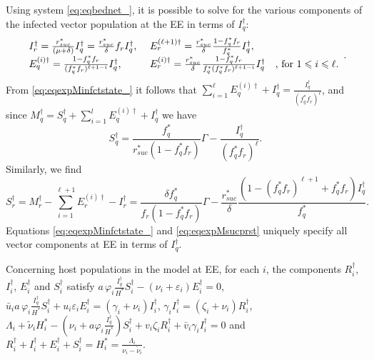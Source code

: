 \documentclass[a4paper]{article}
\newcommand{\dsum}{\displaystyle\sum}
\newcommand{\varpiVar}{r_{suc}}
\begin{document}
Using system \eqref{eq:eqbednet_}, it is possible to solve for the various components of the infected vector population at the EE  in terms of $I_q^\dagger $:
\begin{equation}\label{eq:eqexpMinfctstate_}\begin{array}{ll}
I_r^\dagger =\frac{\varpiVar ^*}{(\mu+\delta)}I_q^\dagger =\frac{\varpiVar ^* }{\delta }f_rI_q^\dagger \hbox{, } & E_r^{(\ell+1)\dagger }=\frac{\varpiVar ^*}{\delta }\frac{1-f^*_qf_r}{f^*_q} I_q^\dagger ,\\ E_q^{(i)\dagger }=\frac{1-f^*_qf_r }{(f^*_qf_r)^{\ell+1-i}}I_q^\dagger \hbox{, } & E_r^{(i)\dagger }=\frac{\varpiVar ^*}{\delta }\frac{1-f^*_qf_r}{ f^*_q(f^*_qf_r)^{\ell+1-i}} I_q^\dagger \quad\hbox{, for } 1\leqslant i\leqslant \ell.\end{array}.
\end{equation}
From \eqref{eq:eqexpMinfctstate_} it follows that $\dsum_{i=1}^\ell E_q^{(i)\dagger }+I_q^\dagger =\frac{I_q^\dagger }{(f^*_qf_r)^\ell}$, and  since $M_q^\dagger=S^\dagger _q+\dsum_{i=1}^lE_q^{(i)\dagger }+I_q^\dagger $ we have
\begin{equation*}
S_q^\dagger =\frac{f^*_q}{\varpiVar ^*(1-f^*_qf_r)}\Gamma - \frac{I_q^\dagger }{(f^*_qf_r)^\ell}.\label{eq:eqexpMsucpqst}
\end{equation*}
Similarly, we find
\begin{equation}
S_r^\dagger =M_r^\dagger -\dsum_{i=1}^{\ell+1}E_r^{(i)\dagger }-I_r^\dagger =\frac{\delta f^*_q}{f_r(1-f^*_qf_r)}\Gamma - \frac{\varpiVar ^*}{\delta}\frac{(1-(f^*_qf_r)^{\ell+1}+f^*_qf_r)I_q^\dagger }{ f^*_q}\label{eq:eqexpMsucprst}.
\end{equation}
Equations \eqref{eq:eqexpMinfctstate_} and \eqref{eq:eqexpMsucprst} uniquely specify all vector components at EE in terms of $I_q^\dagger $.

Concerning host populations in the model at EE, for each $i$, the components $R^\dagger _i$, $I^\dagger _i$, $E^\dagger_i$ and $S^\dagger _i$ satisfy $a\,\varphi_i \frac{I_q^\dagger }{H^*}S^\dagger _i -(\nu_i+\varepsilon_i) E_i^\dagger =0$, $\bar u_ia\,\varphi_i \frac{I_q^\dagger }{H^*}S^\dagger _i+u_i\varepsilon_iE^\dagger_i=(\gamma_i+\nu_i)I^\dagger_i$, $\gamma_iI^\dagger_i=(\zeta_i+\nu_i)R^\dagger_i$, $\Lambda_i+\widetilde \nu_i H^*_i - \left(\nu_i+a\varphi_i \frac{I^\dagger_q}{H^*}\right)S^\dagger_i + v_i\zeta_iR^\dagger_i+\bar v_i\gamma_iI^\dagger_i=0$ and $R_i^\dagger +I_i^\dagger+E^\dagger_i +S^\dagger _i = H^*_i=\frac{\Lambda_i}{\nu_i-\widetilde \nu_i}$. 
\end{document}
